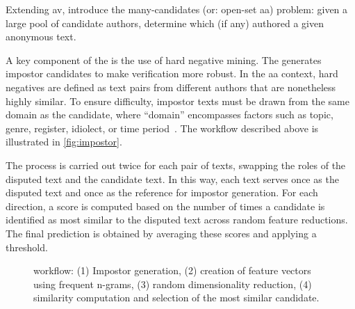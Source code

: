 Extending \ac{av}, \citet{koppel_determining_2014} introduce the many-candidates (or: open-set \ac{aa}) problem: given a large pool of candidate authors, determine which (if any) authored a given anonymous text. 

A key component of the \impAppr{} is the use of hard negative mining. 
The \impAppr{} generates impostor candidates to make verification more robust. 
In the \ac{aa} context, hard negatives are defined as text pairs from different authors that are nonetheless highly similar. 
To ensure difficulty, impostor texts must be drawn from the same domain as the candidate, where “domain” encompasses factors such as topic, genre, register, idiolect, or time period~\citep{bischoff_importance_2020}. 
The workflow described above is illustrated in \autoref{fig:impostor}.

The process is carried out twice for each pair of texts, swapping the roles of the disputed text and the candidate text. 
In this way, each text serves once as the disputed text and once as the reference for impostor generation. 
For each direction, a score is computed based on the number of times a candidate is identified as most similar to the disputed text across random feature reductions. 
The final prediction is obtained by averaging these scores and applying a threshold.


\begin{figure}[htbp]
    \centering
    
    \caption{\impAppr{} workflow: (1) Impostor generation, (2) creation of feature vectors using frequent n-grams, (3) random dimensionality reduction, (4) similarity computation and selection of the most similar candidate.}
    \label{fig:impostor}
\end{figure}



